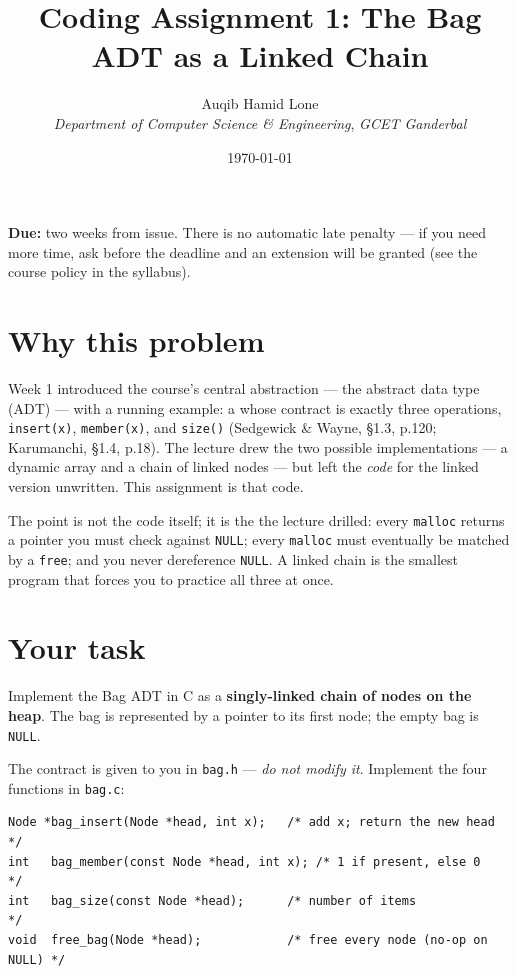 \documentclass[11pt]{article}
\title{Coding Assignment 1: The Bag ADT as a Linked Chain}
\author{Auqib Hamid Lone\\[0.3em]
  \emph{Department of Computer Science \& Engineering}, \emph{GCET Ganderbal}}
\date{\today}
\begin{document}
\maketitle

\noindent\textbf{Due:} two weeks from issue. There is no automatic late penalty --- if you need more time, ask before the deadline and an extension will be granted (see the course policy in the syllabus).

\section{Why this problem}

Week 1 introduced the course's central abstraction --- the abstract data type (ADT) --- with a running example: a  whose contract is exactly three operations, \texttt{insert(x)}, \texttt{member(x)}, and \texttt{size()} (Sedgewick \& Wayne, \S1.3, p.120; Karumanchi, \S1.4, p.18). The lecture drew the two possible implementations --- a dynamic array and a chain of linked nodes --- but left the \emph{code} for the linked version unwritten. This assignment is that code.

The point is not the code itself; it is the  the lecture drilled: every \texttt{malloc} returns a pointer you must check against \texttt{NULL}; every \texttt{malloc} must eventually be matched by a \texttt{free}; and you never dereference \texttt{NULL}. A linked chain is the smallest program that forces you to practice all three at once.

\section{Your task}

Implement the Bag ADT in C as a \textbf{singly-linked chain of nodes on the heap}. The bag is represented by a pointer to its first node; the empty bag is \texttt{NULL}.

The contract is given to you in \texttt{bag.h} --- \emph{do not modify it}. Implement the four functions in \texttt{bag.c}:

\begin{verbatim}
Node *bag_insert(Node *head, int x);   /* add x; return the new head      */
int   bag_member(const Node *head, int x); /* 1 if present, else 0        */
int   bag_size(const Node *head);      /* number of items                 */
void  free_bag(Node *head);            /* free every node (no-op on NULL) */
\end{verbatim}
\end{document}
